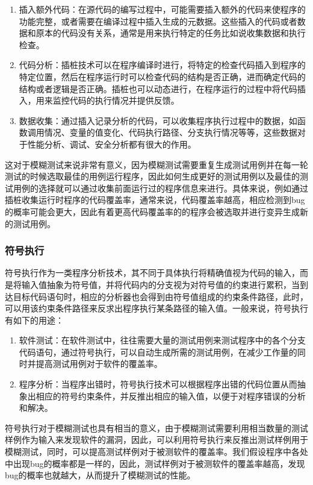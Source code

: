 \begin{enumerate}
\item 插入额外代码：在源代码的编写过程中，可能需要插入额外的代码来使程序的功能完整，或者需要在编译过程中插入生成的元数据。这些插入的代码或者数据和原本的代码没有关系，通常是用来执行特定的任务比如说收集数据和执行检查。
\item 代码分析：插桩技术可以在程序编译时进行，将特定的检查代码插入到程序的特定位置，然后在程序运行时可以检查代码的结构是否正确，进而确定代码的结构或者逻辑是否正确。插桩也可以动态进行，在程序运行的过程中将代码插入，用来监控代码的执行情况并提供反馈。
\item 数据收集：通过插入记录分析的代码，可以收集程序执行过程中的数据，如函数调用情况、变量的值变化、代码执行路径、分支执行情况等等，这些数据对于性能分析、调试、安全分析都有很大的作用。
\end{enumerate}

这对于模糊测试来说非常有意义，因为模糊测试需要重复生成测试用例并在每一轮测试的时候选取最佳的用例运行程序，因此如何生成更好的测试用例以及最佳的测试用例的选择就可以通过收集前面运行过的程序信息来进行。具体来说，例如通过插桩收集运行时程序的代码覆盖率，通常来说，代码覆盖率越高，相应检测到bug的概率可能会更大，因此有着更高代码覆盖率的的程序会被选取并进行变异生成新的测试用例。

\subsubsection{符号执行}

符号执行作为一类程序分析技术，其不同于具体执行将精确值视为代码的输入，而是将输入值抽象为符号值，并将代码内的分支视为对符号值的约束进行累积，当到达目标代码语句时，相应的分析器也会得到由符号值组成的约束条件路径，此时，可以用该约束条件路径来反求出程序执行某条路径的输入值。一般来说，符号执行有如下的用途：

\begin{enumerate}
\item 软件测试：在软件测试中，往往需要大量的测试用例来测试程序中的各个分支代码语句，通过符号执行，可以自动生成所需的测试用例，在减少工作量的同时并提高测试用例对于软件的覆盖率。
\item 程序分析：当程序出错时，符号执行技术可以根据程序出错的代码位置从而抽象出相应的符号约束条件，并反推出相应的输入值，以便于对程序错误的分析和解决。
\end{enumerate}

符号执行对于模糊测试也具有相当的意义，由于模糊测试需要利用相当数量的测试样例作为输入来发现软件的漏洞，因此，可以利用符号执行来反推出测试样例用于模糊测试，同时，可以提高测试样例对于被测软件的覆盖率。我们假设程序中各处中出现bug的概率都是一样的，因此，测试样例对于被测软件的覆盖率越高，发现bug的概率也就越大，从而提升了模糊测试的性能。

